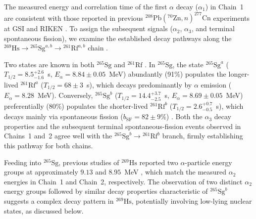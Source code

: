 \documentclass[final,5p,times,twocolumn,number,sort&compress]{elsarticle}
\begin{document}
The measured energy and correlation time of the first $\alpha$ decay ($\alpha_1$) in Chain~1 are consistent with those reported in previous $^{208}\mathrm{Pb}(^{70}\mathrm{Zn},n)^{277}\mathrm{Cn}$ experiments at GSI \cite{hofmann1996NewElement112,hofmann2002NewResultsElements} and RIKEN \cite{morita2007ExperimentSynthesisIsotope277,sumita2013NewResultProduction}. To assign the subsequent signals ($\alpha_2$, $\alpha_3$, and terminal spontaneous fission), we examine the established decay pathways along the $^{269}\mathrm{Hs} \rightarrow {}^{265}\mathrm{Sg}^{a,b} \rightarrow {}^{261}\mathrm{Rf}^{a,b}$ chain \cite{hofmann2002NewResultsElements,dvorakDoublyMagicNucleus2006,dullmannCm248Ne2008,dvorakObservation3Evaporation2008,habaProductionDecayProperties2011,habaProduction265Sg2012}.

Two states are known in both $^{265}\mathrm{Sg}$ and $^{261}\mathrm{Rf}$ \cite{habaProductionDecayProperties2011,habaProduction265Sg2012}. In $^{265}\mathrm{Sg}$, the state $^{265}\mathrm{Sg}^{a}$ ($T_{1/2} = 8.5^{+2.6}_{-1.6}$~s, $E_{\alpha} = 8.84 \pm 0.05$~MeV) abundantly (91\%) populates the longer-lived $^{261}\mathrm{Rf}^{a}$ ($T_{1/2} = 68 \pm 3$~s), which decays predominantly by $\alpha$ emission ($E_{\alpha} = 8.28$~MeV). Conversely, $^{265}\mathrm{Sg}^{b}$ ($T_{1/2} = 14.4^{+3.7}_{-2.5}$~s, $E_{\alpha} = 8.69 \pm 0.05$~MeV) preferentially (80\%) populates the shorter-lived $^{261}\mathrm{Rf}^{b}$ ($T_{1/2} = 2.6^{+0.7}_{-0.5}$~s), which decays mainly via spontaneous fission ($b_{\mathrm{SF}} = 82 \pm 9\%$) \cite{habaProduction265Sg2012}. Both the $\alpha_3$ decay properties and the subsequent terminal spontaneous-fission events observed in Chains~1 and~2 agree well with the $^{265}\mathrm{Sg}^{b} \rightarrow {}^{261}\mathrm{Rf}^{b}$ branch, firmly establishing this pathway for both chains.

Feeding into $^{265}\mathrm{Sg}$, previous studies of $^{269}\mathrm{Hs}$ reported two $\alpha$-particle energy groups at approximately $9.13$ and $8.95$~MeV \cite{vonzweidorfEvidenceFormationSodium2004,turlerDecayProperties269Hs2003,dvorakDoublyMagicNucleus2006,dvorakObservation3Evaporation2008,turlerNuclearStructureReaction2012}, which match the measured $\alpha_2$ energies in Chain~1 and Chain~2, respectively. The observation of two distinct $\alpha_2$ energy groups followed by similar decay properties characteristic of $^{265}\mathrm{Sg}^{b}$ suggests a complex decay pattern in $^{269}\mathrm{Hs}$, potentially involving low-lying nuclear states, as discussed below.
\end{document}

